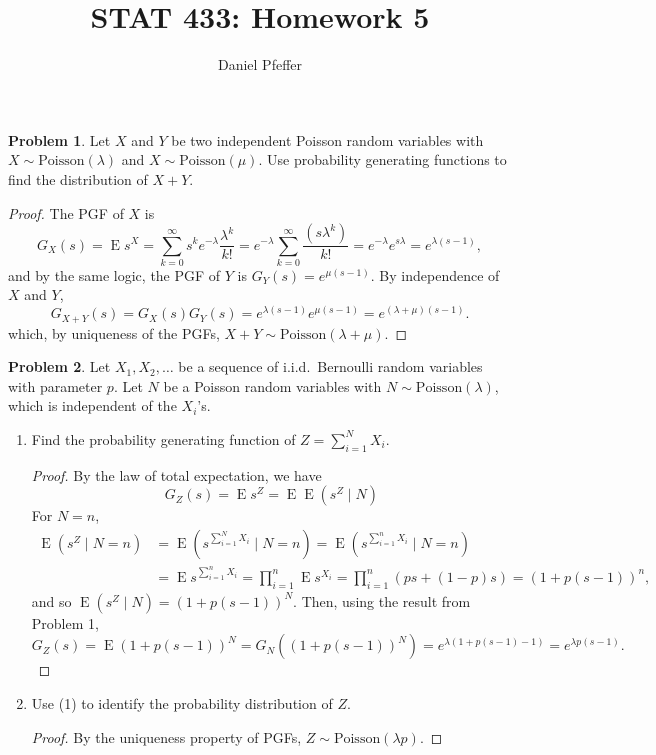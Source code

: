 \documentclass[oneside,reqno]{amsart}
\title{STAT 433: Homework 5}
\author{Daniel Pfeffer}
\DeclareMathOperator{\E}{\mathrm{E}}
\newcommand{\Pois}{\mathrm{Poisson}}
\theoremstyle{definition}
\newtheorem{prob}{Problem}
\begin{document}
\maketitle

\begin{prob}
Let $X$ and $Y$ be two independent Poisson random variables with $X \sim \Pois(\lambda)$ and $X \sim \Pois(\mu)$. Use probability generating functions to find the distribution of $X+Y$. 
\end{prob}

\begin{proof}
The PGF of $X$ is
\[
	G_X(s) = \E s^X = \sum_{k=0}^\infty s^k e^{-\lambda} \frac{\lambda^k}{k!} = e^{-\lambda} \sum_{k=0}^\infty \frac{(s\lambda^k)}{k!} = e^{-\lambda} e^{s\lambda} = e^{\lambda(s-1)},
\]
and by the same logic, the PGF of $Y$ is $G_Y(s) =  e^{\mu(s-1)}$. By independence of $X$ and $Y$,
\[
	G_{X+Y}(s) = G_X(s)G_Y(s) = e^{\lambda(s-1)}e^{\mu(s-1)} = e^{(\lambda + \mu)(s-1)}.
\]
which, by uniqueness of the PGFs, $X+Y\sim \Pois(\lambda + \mu)$.
\end{proof}

\begin{prob}
Let $X_1, X_2, \dotsc$ be a sequence of i.i.d.\ Bernoulli random variables with parameter $p$. Let $N$ be a Poisson random variables with $N \sim \Pois(\lambda)$, which is independent of the $X_i$'s. 
\end{prob}

\begin{enumerate}
\item
Find the probability generating function of $Z=\sum_{i=1}^N X_i$.
\begin{proof}
By the law of total expectation, we have
\[
	G_Z(s) = \E s^Z = \E \E(s^Z \mid N)
\]
For $N=n$, 
\begin{align*}
	\E(s^Z \mid N= n) &= \E(s^{\sum_{i=1}^N X_i} \mid N = n) 
	= \E(s^{\sum_{i=1}^n X_i} \mid N = n)  \\
	&= \E s^{\sum_{i=1}^n X_i}  
	= \prod_{i=1}^n \E s^{X_i}
	= \prod_{i=1}^n (ps + (1-p)s) = (1 + p(s-1))^n,
\end{align*}
and so $\E(s^Z \mid N)= (1 + p(s-1))^N$. Then, using the result from Problem 1, 
\[
	G_Z(s) = \E (1+p(s-1))^N  = G_N((1+p(s-1))^N ) = e^{\lambda(1+p(s-1) - 1)} = e^{\lambda p(s-1)}.
\]
\end{proof}

\item
Use (1) to identify the probability distribution of $Z$.  
\begin{proof}
By the uniqueness property of PGFs, $Z \sim \Pois(\lambda p)$.
\end{proof}
\end{enumerate}
\end{document}
